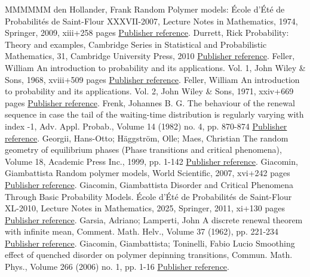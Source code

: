 \documentclass[11pt]{article}
\theoremstyle{definition}
\numberwithin{equation}{section}
\numberwithin{figure}{section}
\numberwithin{table}{section}
\begin{document}
\begin{thebibliography}{MMMMMM}
 den Hollander, Frank Random Polymer models: École d’Été de Probabilités de Saint-Flour XXXVII-2007, Lecture Notes in Mathematics, 1974, Springer, 2009, xiii+258 pages \href{https://ahl.centre-mersenne.org/item/AHL_2019__2__281_0/#dH09}{Publisher reference}.
 Durrett, Rick Probability: Theory and examples, Cambridge Series in Statistical and Probabilistic Mathematics, 31, Cambridge University Press, 2010 \href{https://ahl.centre-mersenne.org/item/AHL_2019__2__281_0/#Du10}{Publisher reference}.
 Feller, William An introduction to probability and its applications. Vol. 1, John Wiley \& Sons, 1968, xviii+509 pages \href{https://ahl.centre-mersenne.org/item/AHL_2019__2__281_0/#Feller68}{Publisher reference}.
 Feller, William An introduction to probability and its applications. Vol. 2, John Wiley \& Sons, 1971, xxiv+669 pages \href{https://ahl.centre-mersenne.org/item/AHL_2019__2__281_0/#Feller71}{Publisher reference}.
 Frenk, Johannes B. G. The behaviour of the renewal sequence in case the tail of the waiting-time distribution is regularly varying with index -1, Adv. Appl. Probab., Volume 14 (1982) no. 4, pp. 870-874 \href{https://ahl.centre-mersenne.org/item/AHL_2019__2__281_0/#Fr82}{Publisher reference}.
 Georgii, Hans-Otto; Häggström, Olle; Maes, Christian The random geometry of equilibrium phases (Phase transitions and critical phenomena), Volume 18, Academic Press Inc., 1999, pp. 1-142 \href{https://ahl.centre-mersenne.org/item/AHL_2019__2__281_0/#GHM1999}{Publisher reference}.
 Giacomin, Giambattista Random polymer models, World Scientific, 2007, xvi+242 pages \href{https://ahl.centre-mersenne.org/item/AHL_2019__2__281_0/#Gi2007}{Publisher reference}.
 Giacomin, Giambattista Disorder and Critical Phenomena Through Basic Probability Models. École d’Été de Probabilités de Saint-Flour XL-2010, Lecture Notes in Mathematics, 2025, Springer, 2011, xi+130 pages \href{https://ahl.centre-mersenne.org/item/AHL_2019__2__281_0/#Gi2011}{Publisher reference}.
 Garsia, Adriano; Lamperti, John A discrete renewal theorem with infinite mean, Comment. Math. Helv., Volume 37 (1962), pp. 221-234 \href{https://ahl.centre-mersenne.org/item/AHL_2019__2__281_0/#GL63}{Publisher reference}.
 Giacomin, Giambattista; Toninelli, Fabio Lucio Smoothing effect of quenched disorder on polymer depinning transitions, Commun. Math. Phys., Volume 266 (2006) no. 1, pp. 1-16 \href{https://ahl.centre-mersenne.org/item/AHL_2019__2__281_0/#GiT2006}{Publisher reference}.

\end{thebibliography}
\end{document}
